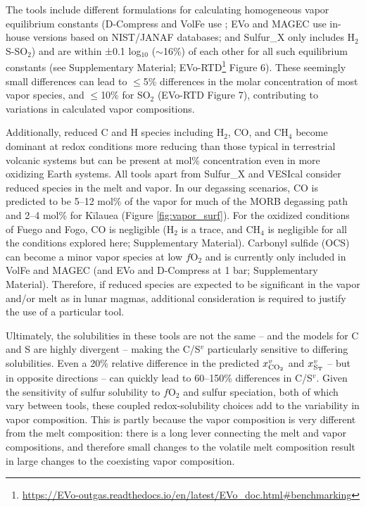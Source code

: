 \documentclass[draft, english]{volcanica-template}
\begin{document}
The tools include different formulations for calculating homogeneous vapor equilibrium constants (D-Compress and VolFe use \textcite{ohmoto1977}; EVo and MAGEC use in-house versions based on NIST/JANAF databases; and Sulfur\_X only includes H$_2$S-SO$_2$) and are within ±0.1 log$_{10}$ ($\sim$16\%) of each other for all such equilibrium constants (see Supplementary Material; EVo-RTD\footnote{\url{https://EVo-outgas.readthedocs.io/en/latest/EVo_doc.html\#benchmarking}} Figure 6). These seemingly small differences can lead to $\leq$5\% differences in the molar concentration of most vapor species, and $\leq$10\% for SO$_2$ (EVo-RTD Figure 7), contributing to variations in calculated vapor compositions.

Additionally, reduced C and H species including H$_2$, CO, and CH$_4$ become dominant at redox conditions more reducing than those typical in terrestrial volcanic systems \parencite[$\sim$IW\,<\,1;][]{holloway1994application} but can be present at mol\% concentration even in more oxidizing Earth systems. All tools apart from Sulfur\_X and VESIcal consider reduced species in the melt and vapor. In our degassing scenarios, CO is predicted to be 5–12 mol\% of the vapor for much of the MORB degassing path and 2–4 mol\% for Kīlauea (Figure \ref{fig:vapor_surf}). For the oxidized conditions of Fuego and Fogo, CO is negligible (H$_2$ is a trace, and CH$_4$ is negligible for all the conditions explored here; Supplementary Material). Carbonyl sulfide (OCS) can become a minor vapor species at low $f$O$_2$ and is currently only included in VolFe and MAGEC (and EVo and D-Compress at 1 bar; Supplementary Material). Therefore, if reduced species are expected to be significant in the vapor and/or melt as in lunar magmas, additional consideration is required to justify the use of a particular tool.

Ultimately, the solubilities in these tools are not the same -- and the models for C and S are highly divergent -- making the C/S$^v$ particularly sensitive to differing solubilities. Even a 20\% relative difference in the predicted $x^v_{\rm{CO}_2}$ and $x^v_{\rm{S}_T}$ -- but in opposite directions -- can quickly lead to 60--150\% differences in C/S$^v$. Given the sensitivity of sulfur solubility to $f$O$_2$ and sulfur speciation, both of which vary between tools, these coupled redox-solubility choices add to the variability in vapor composition. This is partly because the vapor composition is very different from the melt composition: there is a long lever connecting the melt and vapor compositions, and therefore small changes to the volatile melt composition result in large changes to the coexisting vapor composition.
\end{document}
